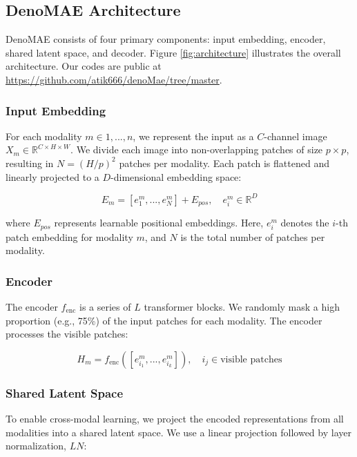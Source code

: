 \subsection{DenoMAE Architecture}

DenoMAE consists of four primary components: input embedding, encoder, shared latent space, and decoder. Figure \ref{fig:architecture} illustrates the overall architecture. Our codes are public at \url{https://github.com/atik666/denoMae/tree/master}.

\subsubsection{Input Embedding}

For each modality $m \in {1, ..., n}$, we represent the input as a $C$-channel image $X_m \in \mathbb{R}^{C \times H \times W}$. We divide each image into non-overlapping patches of size $p \times p$, resulting in $N = (H/p)^2$ patches per modality. Each patch is flattened and linearly projected to a $D$-dimensional embedding space:

\begin{equation}
E_m = [e^m_1, ..., e^m_N] + E_{pos}, \quad e^m_i \in \mathbb{R}^D
\end{equation}

where $E_{pos}$ represents learnable positional embeddings. Here, $e^m_i$ denotes the $i$-th patch embedding for modality $m$, and $N$ is the total number of patches per modality.

\subsubsection{Encoder}

The encoder $f_{\textrm{enc}}$ is a series of $L$ transformer blocks. We randomly mask a high proportion (e.g., 75\%) of the input patches for each modality. The encoder processes the visible patches:

\begin{equation}
H_m = f_{\textrm{enc}}([e^m_{i_1}, ..., e^m_{i_k}]), \quad i_j \in \text{visible patches}
\end{equation}

\subsubsection{Shared Latent Space}

To enable cross-modal learning, we project the encoded representations from all modalities into a shared latent space. We use a linear projection followed by layer normalization, $LN$:

